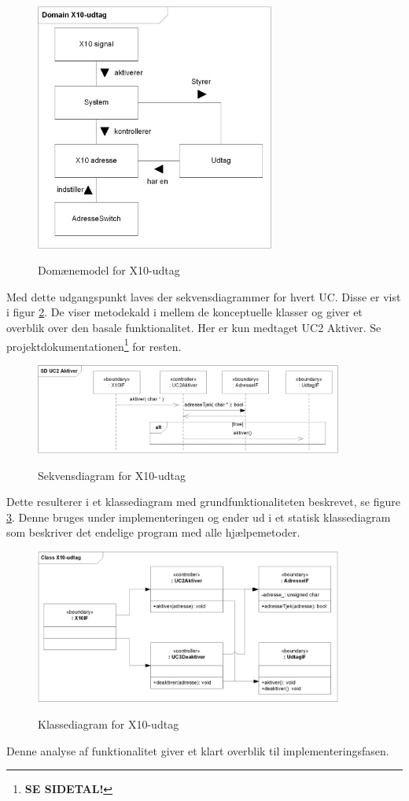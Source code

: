 \begin{figure}[!htb]
     \centering
     { \includegraphics[width=0.7\textwidth]{Billeder/UML/X10_modtager_Domain}}
     \caption{Domænemodel for X10-udtag}
     \label{fig:X10_udtag_domaenemodel}
\end{figure}

Med dette udgangspunkt laves der sekvensdiagrammer for hvert UC. Disse er vist i figur \ref{fig:X10_udtag_sd}. De viser metodekald i mellem de konceptuelle klasser og giver et overblik over den basale funktionalitet. Her er kun medtaget UC2 Aktiver. Se projektdokumentationen\footnote{\textbf{SE SIDETAL!}} for resten.

\begin{figure}[!htb]
     \centering
     { \includegraphics[width=0.9\textwidth]{Billeder/UML/X10_modtager_SD}}
     \caption{Sekvensdiagram for X10-udtag}
     \label{fig:X10_udtag_sd}
\end{figure}

Dette resulterer i et klassediagram med grundfunktionaliteten beskrevet, se figure \ref{fig:X10_udtag_class}. Denne bruges under implementeringen og ender ud i et statisk klassediagram som beskriver det endelige program med alle hjælpemetoder.

\begin{figure}[!htb]
     \centering
     { \includegraphics[width=0.9\textwidth]{Billeder/UML/X10_modtager_Class}}
     \caption{Klassediagram for X10-udtag}
     \label{fig:X10_udtag_class}
\end{figure}

Denne analyse af funktionalitet giver et klart overblik til implementeringsfasen.